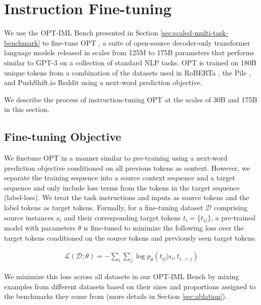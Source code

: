 \section{Instruction Fine-tuning}
\label{sec:modeling}

We use the OPT-IML Bench presented in Section \ref{sec:scaled-multi-task-benchmark} to fine-tune OPT \citep{zhang2022opt}, a suite of open-source decoder-only transformer language models released in scales from 125M to 175B parameters that performs similar to GPT-3 \citep{brown2020gpt} on a collection of standard NLP tasks. OPT is trained on 180B unique tokens from a combination of the datasets used in RoBERTa \citep{liu2019roberta}, the Pile \citep{gao2020pile}, and PushShift.io Reddit \citep {baumgartner2020pushshift,roller2020recipes} using a next-word prediction objective. 

We describe the process of instruction-tuning OPT at the scales of 30B and 175B in this section. 

\subsection{Fine-tuning Objective}

We finetune OPT in a manner similar to pre-training using a next-word prediction objective conditioned on all previous tokens as context. However, we separate the training sequence into a source context sequence and a target sequence and only include loss terms from the tokens in the target sequence (label-loss). We treat the task instructions and inputs as source tokens and the label tokens as target tokens. Formally, for a fine-tuning dataset $\mathcal{D}$ comprising source instances $s_i$ and their corresponding target tokens $t_i=\{t_{ij}\}$, a pre-trained model with parameters $\theta$ is fine-tuned to minimize the following loss over the target tokens conditioned on the source tokens and previously seen target tokens.

\begin{align}
    \mathcal{L}(\mathcal{D}; \theta) = - \sum_i \sum_j \log p_{\theta}(t_{ij}|s_i,t_{i,<j})
\end{align}

We minimize this loss across all datasets in our OPT-IML Bench by mixing examples from different datasets based on their sizes and proportions assigned to the benchmarks they come from (more details in Section \ref{sec:ablation}).

